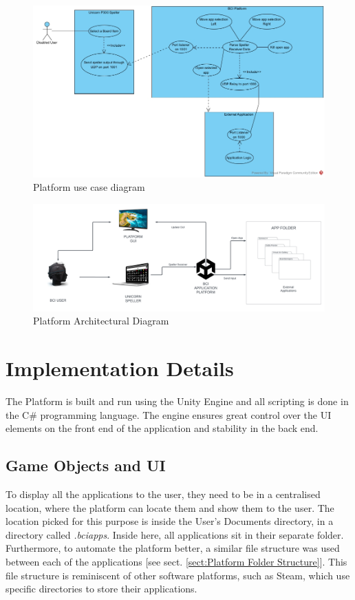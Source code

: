 \begin{figure}[H]
  \centering
  \includegraphics[width=1\textwidth]{Diagrams/Use Case/Platform.jpg}
  \caption{Platform use case diagram}
  \label{fig:Platform use case diagram}
\end{figure}
\begin{figure}[H]
  \centering
  \includegraphics[width=1\textwidth]{Diagrams/Platform Architectural.png}
  \caption{Platform Architectural Diagram}
  \label{fig:Platform Architectural Diagram}
\end{figure}


\section{Implementation Details}
The Platform is built and run using the Unity Engine and all scripting is done in the C\# programming language. The engine ensures great control over the UI elements on the front end of the application and stability in the back end.

\subsection{Game Objects and UI}
 To display all the applications to the user, they need to be in a centralised location, where the platform can locate them and show them to the user. The location picked for this purpose is inside the User's Documents directory, in a directory called \textit{.bciapps}. Inside here, all applications sit in their separate folder. Furthermore, to automate the platform better, a similar file structure was used between each of the applications [see sect. \ref{sect:Platform Folder Structure}]. This file structure is reminiscent of other software platforms, such as Steam, which use specific directories to store their applications.

